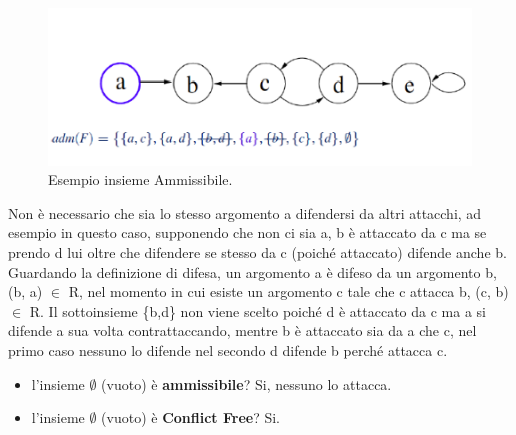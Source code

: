 \begin{figure}[H]
    \centering
    \includegraphics[width=12cm, keepaspectratio]{capitoli/img/Cap6/ammissibile.png}
    \caption{Esempio insieme Ammissibile.}
\end{figure}

Non è necessario che sia lo stesso argomento a difendersi da altri attacchi, ad
esempio in questo caso, supponendo che non ci sia a, b è attaccato da c ma se
prendo d lui oltre che difendere se stesso da c (poiché attaccato) difende anche
b. Guardando la definizione di difesa, un argomento a è difeso da un argomento
b, (b, a) $\in$ R, nel momento in cui esiste un argomento c tale che c attacca
b, (c, b) $\in$ R. Il sottoinsieme \{b,d\} non viene scelto poiché d è attaccato
da c ma a si difende a sua volta contrattaccando, mentre b è attaccato sia da a
che c, nel primo caso nessuno lo difende nel secondo d difende b perché attacca
c.
\begin{itemize}
    \item l'insieme $\emptyset$ (vuoto) è \textbf{ammissibile}? Si, nessuno lo attacca.
    \item l'insieme $\emptyset$ (vuoto) è \textbf{Conflict Free}? Si.
\end{itemize}

